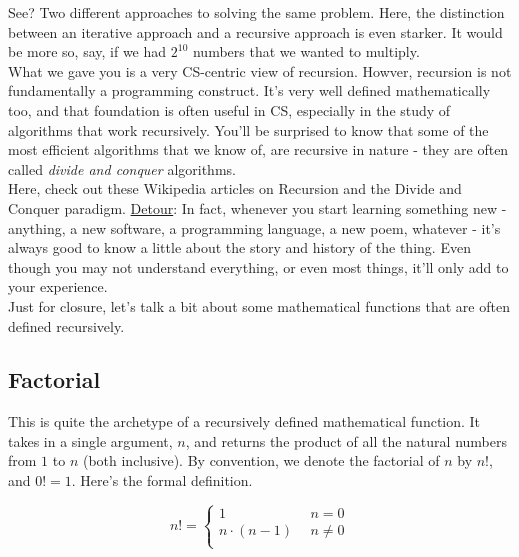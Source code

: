 \documentclass{article}
\begin{document}
\noindent See? Two different approaches to solving the same problem. Here, the distinction between an iterative approach and a recursive approach is even starker. It would be more so, say, if we had $2^10$ numbers that we wanted to multiply. \\

\noindent What we gave you is a very CS-centric view of recursion. Howver, recursion is not fundamentally a programming construct. It's very well defined mathematically too, and that foundation is often useful in CS, especially in the study of algorithms that work recursively. You'll be surprised to know that some of the most efficient algorithms that we know of, are recursive in nature - they are often called \textit{divide and conquer} algorithms. \\

\noindent Here, check out these Wikipedia articles on Recursion\cite{Recursion in CS} and the Divide and Conquer paradigm\cite{Divide and Conquer}. \underline{Detour}: In fact, whenever you start learning something new - anything, a new software, a programming language, a new poem, whatever - it's always good to know a little about the story and history of the thing. Even though you may not understand everything, or even most things, it'll only add to your experience. \\

\noindent Just for closure, let's talk a bit about some mathematical functions that are often defined recursively. 

\subsection{Factorial} 

\noindent This is quite the archetype of a recursively defined mathematical function. It takes in a single argument, $n$, and returns the product of all the natural numbers from $1$ to $n$ (both inclusive). By convention, we denote the factorial of $n$ by $n!$, and $0! = 1$. Here's the formal definition. 

\begin{displaymath}
    n! = \left\{
    \begin{array}{lr}
        1 & \ \ n = 0\\
        n\cdot (n-1) & \ \ n \neq 0\\
    \end{array}
    \right.
\end{displaymath} 
\end{document}
